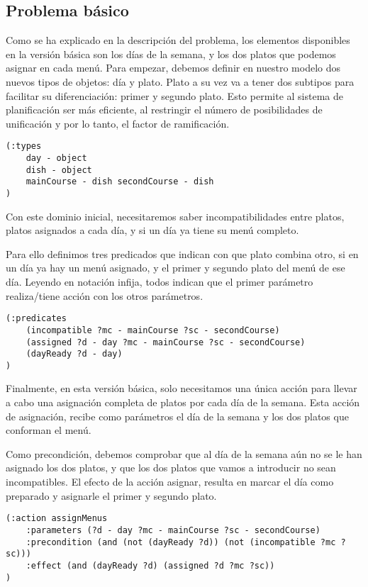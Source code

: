 \documentclass{article}
\begin{document}
\subsection{Problema básico}
Como se ha explicado en la descripción del problema, los elementos disponibles en la versión básica son los días de la semana, y los dos platos que podemos asignar en cada menú. Para empezar, debemos definir en nuestro modelo dos nuevos tipos de objetos: día y plato. Plato a su vez va a tener dos subtipos para facilitar su diferenciación: primer y segundo plato. Esto permite al sistema de planificación ser más eficiente, al restringir el número de posibilidades de unificación y por lo tanto, el factor de ramificación.
\begin{lstlisting}[language=pddl]
(:types
    day - object
    dish - object
    mainCourse - dish secondCourse - dish
)
\end{lstlisting}
Con este dominio inicial, necesitaremos saber incompatibilidades entre platos, platos asignados a cada día, y si un día ya tiene su menú completo.
\par
Para ello definimos tres predicados que indican con que plato combina otro, si en un día ya hay un menú asignado, y el primer y segundo plato del menú de ese día. Leyendo en notación infija, todos indican que el primer parámetro realiza/tiene acción con los otros parámetros.
\begin{lstlisting}[language=pddl]
(:predicates
    (incompatible ?mc - mainCourse ?sc - secondCourse)
    (assigned ?d - day ?mc - mainCourse ?sc - secondCourse)
    (dayReady ?d - day)
)
\end{lstlisting}
Finalmente, en esta versión básica, solo necesitamos una única acción para llevar a cabo una asignación completa de platos por cada día de la semana. Esta acción de asignación, recibe como parámetros el día de la semana y los dos platos que conforman el menú.
\par
Como precondición, debemos comprobar que al día de la semana aún no se le han asignado los dos platos, y que los dos platos que vamos a introducir no sean incompatibles. El efecto de la acción asignar, resulta en marcar el día como preparado y asignarle el primer y segundo plato.
\begin{lstlisting}[language=pddl]
(:action assignMenus
    :parameters (?d - day ?mc - mainCourse ?sc - secondCourse)
    :precondition (and (not (dayReady ?d)) (not (incompatible ?mc ?sc)))
    :effect (and (dayReady ?d) (assigned ?d ?mc ?sc))
)
\end{lstlisting}
\end{document}
